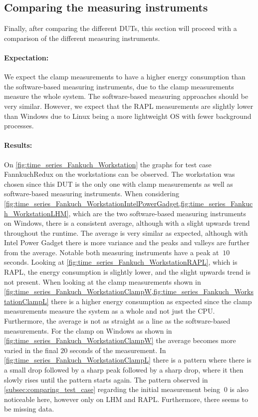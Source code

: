 
\subsection{Comparing the measuring instruments}
Finally, after comparing the different DUTs, this section will proceed with a comparison of the different measuring instruments.

\paragraph{Expectation:}
We expect the clamp measurements to have a higher energy consumption than the software-based measuring instruments, due to the clamp measurements measure the whole system. The software-based measuring approaches should be very similar. However, we expect that the RAPL measurements are slightly lower than Windows due to Linux being a more lightweight OS with fewer background processes.

\paragraph{Results:}
On \cref{fig:time_series_Fankuch_Workstation} the graphs for test case FannkuchRedux on the workstations can be observed. The workstation was chosen since this DUT is the only one with clamp measurements as well as software-based measuring instruments. When considering \cref{fig:time_series_Fankuch_WorkstationIntelPowerGadget,fig:time_series_Fankuch_WorkstationLHM}, which are the two software-based measuring instruments on Windows, there is a consistent average, although with a slight upwards trend throughout the runtime. The average is very similar as expected, although with Intel Power Gadget there is more variance and the peaks and valleys are further from the average. Notable both measuring instruments have a peak at $~10$ seconds. Looking at \cref{fig:time_series_Fankuch_WorkstationRAPL}, which is RAPL, the energy consumption is slightly lower, and the slight upwards trend is not present. When looking at the clamp measurements shown in \cref{fig:time_series_Fankuch_WorkstationClampW,fig:time_series_Fankuch_WorkstationClampL} there is a higher energy consumption as expected since the clamp measurements measure the system as a whole and not just the CPU. Furthermore, the average is not as straight as a line as the software-based measurements. For the clamp on Windows as shown in \cref{fig:time_series_Fankuch_WorkstationClampW} the average becomes more varied in the final $20$ seconds of the measurement. In \cref{fig:time_series_Fankuch_WorkstationClampL} there is a pattern where there is a small drop followed by a sharp peak followed by a sharp drop, where it then slowly rises until the pattern starts again. The pattern observed in \cref{subsec:comparing_test_case} regarding the initial measurement being $~0$ is also noticeable here, however only on LHM and RAPL. Furthermore, there seems to be missing data.

